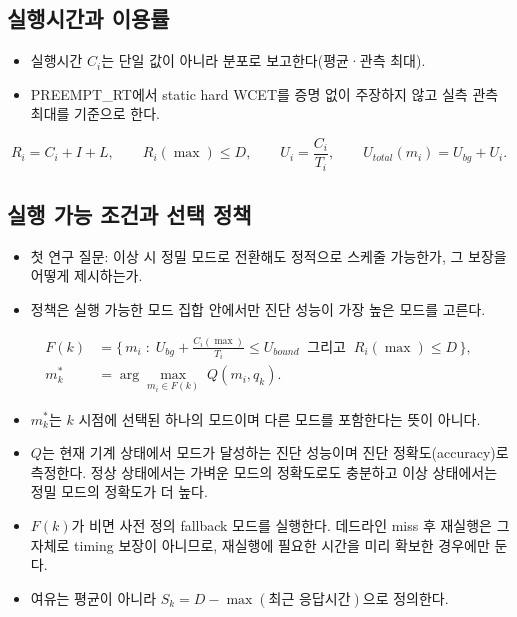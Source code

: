 \documentclass[10pt]{article}
\begin{document}
\subsection{실행시간과 이용률}
\begin{itemize}
\item 실행시간 $C_i$는 단일 값이 아니라 분포로 보고한다(평균·관측 최대).
\item PREEMPT\_RT에서 static hard WCET를 증명 없이 주장하지 않고 실측 관측 최대를 기준으로 한다.
\end{itemize}
\begin{equation}
R_i = C_i + I + L,\qquad R_i(\max) \le D,\qquad U_i=\frac{C_i}{T_i},\qquad U_{total}(m_i)=U_{bg}+U_i.
\end{equation}

\subsection{실행 가능 조건과 선택 정책}
\begin{itemize}
\item 첫 연구 질문: 이상 시 정밀 모드로 전환해도 정적으로 스케줄 가능한가, 그 보장을 어떻게 제시하는가.
\item 정책은 실행 가능한 모드 집합 안에서만 진단 성능이 가장 높은 모드를 고른다.
\end{itemize}
\begin{align}
F(k) &= \Big\{\, m_i \;:\; U_{bg}+\tfrac{C_i(\max)}{T_i}\le U_{bound}\ \text{ 그리고 }\ R_i(\max)\le D \,\Big\},\\
m^{*}_k &= \arg\max_{m_i \in F(k)}\; Q(m_i, q_k).
\end{align}
\begin{itemize}
\item $m^{*}_k$는 $k$ 시점에 선택된 하나의 모드이며 다른 모드를 포함한다는 뜻이 아니다.
\item $Q$는 현재 기계 상태에서 모드가 달성하는 진단 성능이며 진단 정확도(accuracy)로 측정한다. 정상 상태에서는 가벼운 모드의 정확도로도 충분하고 이상 상태에서는 정밀 모드의 정확도가 더 높다.
\item $F(k)$가 비면 사전 정의 fallback 모드를 실행한다. 데드라인 miss 후 재실행은 그 자체로 timing 보장이 아니므로, 재실행에 필요한 시간을 미리 확보한 경우에만 둔다.
\item 여유는 평균이 아니라 $S_k=D-\max(\text{최근 응답시간})$으로 정의한다.
\end{itemize}
\end{document}
